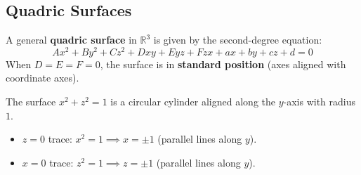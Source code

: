 \subsection{Quadric Surfaces}

A general \textbf{quadric surface} in $\mathbb{R}^3$ is given by the second-degree equation:
\[
Ax^2 + By^2 + Cz^2 + Dxy + Eyz + Fzx + ax + by + cz + d = 0
\]
When $D = E = F = 0$, the surface is in \textbf{standard position} (axes aligned with coordinate axes).

\begin{example}
The surface $x^2 + z^2 = 1$ is a circular cylinder aligned along the $y$-axis with radius $1$.
\begin{itemize}
    \item $z = 0$ trace: $x^2 = 1 \implies x = \pm 1$ (parallel lines along $y$).
    \item $x = 0$ trace: $z^2 = 1 \implies z = \pm 1$ (parallel lines along $y$).
\end{itemize}

\begin{center}
\end{center}
\end{example}


